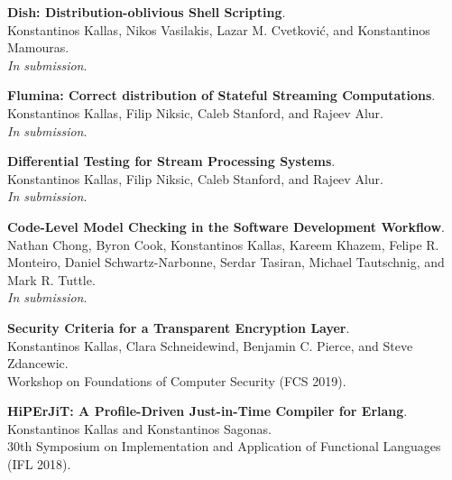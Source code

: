 \textbf{Dish: Distribution-oblivious Shell Scripting}. \\
Konstantinos Kallas, Nikos Vasilakis, Lazar M. Cvetković, and Konstantinos Mamouras. \\
\emph{In submission}.

\textbf{Flumina: Correct distribution of Stateful Streaming Computations}. \\
Konstantinos Kallas, Filip Niksic, Caleb Stanford, and Rajeev Alur. \\
\emph{In submission}.

\textbf{Differential Testing for Stream Processing Systems}. \\
Konstantinos Kallas, Filip Niksic, Caleb Stanford, and Rajeev Alur. \\
\emph{In submission}.

\textbf{Code-Level Model Checking in the Software Development Workflow}. \\
Nathan Chong, Byron Cook, Konstantinos Kallas, Kareem Khazem, Felipe R. Monteiro, Daniel Schwartz-Narbonne, Serdar Tasiran, Michael Tautschnig, and Mark R. Tuttle. \\
\emph{In submission}.

\textbf{Security Criteria for a Transparent Encryption Layer}. \\
Konstantinos Kallas, Clara Schneidewind, Benjamin C. Pierce, and Steve Zdancewic. \\
Workshop on Foundations of Computer Security (FCS 2019).

\textbf{HiPErJiT: A Profile-Driven Just-in-Time Compiler for Erlang}. \\
Konstantinos Kallas and Konstantinos Sagonas. \\
30th Symposium on Implementation and Application of Functional Languages (IFL 2018).



